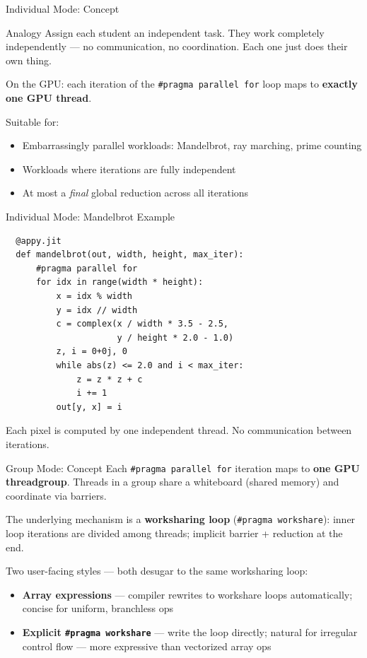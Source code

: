 \documentclass[aspectratio=169]{beamer}
\begin{document}
\begin{frame}{Individual Mode: Concept}
  \begin{block}{Analogy}
    Assign each student an independent task. They work completely independently —
    no communication, no coordination. Each one just does their own thing.
  \end{block}

  \vspace{1em}
  On the GPU: each iteration of the \texttt{\#pragma parallel for} loop maps to
  \textbf{exactly one GPU thread}.

  \vspace{1em}
  Suitable for:
  \begin{itemize}
    \item Embarrassingly parallel workloads: Mandelbrot, ray marching, prime counting
    \item Workloads where iterations are fully independent
    \item At most a \emph{final} global reduction across all iterations
  \end{itemize}
\end{frame}

\begin{frame}[fragile]{Individual Mode: Mandelbrot Example}
  \begin{verbatim}
  @appy.jit
  def mandelbrot(out, width, height, max_iter):
      #pragma parallel for
      for idx in range(width * height):
          x = idx % width
          y = idx // width
          c = complex(x / width * 3.5 - 2.5,
                      y / height * 2.0 - 1.0)
          z, i = 0+0j, 0
          while abs(z) <= 2.0 and i < max_iter:
              z = z * z + c
              i += 1
          out[y, x] = i
  \end{verbatim}
  Each pixel is computed by one independent thread.
  No communication between iterations.
\end{frame}

\begin{frame}{Group Mode: Concept}
  Each \texttt{\#pragma parallel for} iteration maps to \textbf{one GPU threadgroup}.
  Threads in a group share a whiteboard (shared memory) and coordinate via barriers.

  \vspace{0.6em}
  The underlying mechanism is a \textbf{worksharing loop} (\texttt{\#pragma workshare}):
  inner loop iterations are divided among threads; implicit barrier + reduction at the end.

  \vspace{0.5em}
  Two user-facing styles — both desugar to the same worksharing loop:
  \begin{itemize}
    \item \textbf{Array expressions} — compiler rewrites to workshare loops automatically;
          concise for uniform, branchless ops
    \item \textbf{Explicit \texttt{\#pragma workshare}} — write the loop directly;
          natural for irregular control flow — more expressive than vectorized array ops
  \end{itemize}
\end{frame}
\end{document}
